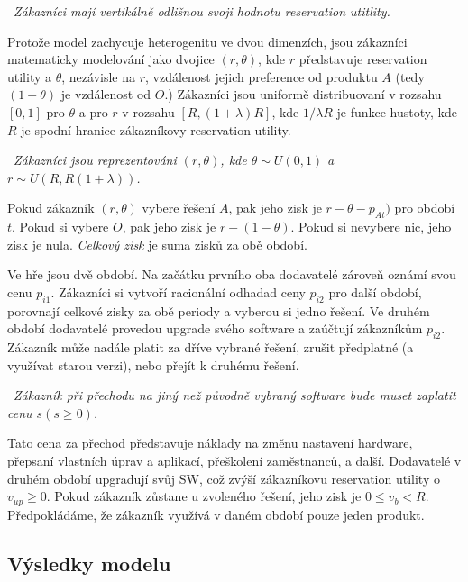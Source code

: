 \begin{multicols}{2}
	\vspace{10pt}
	~{\em Zákazníci mají vertikálně odlišnou svoji hodnotu reservation utitlity.}
	\vspace{10pt}

	Protože model zachycuje heterogenitu ve dvou dimenzích, jsou zákazníci matematicky modelování jako dvojice $(r,\theta)$, kde $r$ představuje reservation utility a $\theta$, nezávisle na $r$, vzdálenost jejich preference od produktu $A$ (tedy $(1-\theta)$ je vzdálenost od $O$.) Zákazníci jsou uniformě distribuovaní v rozsahu $[0,1]$ pro $\theta$ a pro $r$ v rozsahu $[R, (1+\lambda)R]$, kde $1/\lambda R$ je funkce hustoty, kde $R$ je spodní hranice zákazníkovy reservation utility.

		\vspace{10pt}
		~{\em Zákazníci jsou reprezentováni $(r,\theta)$, kde $\theta \sim U(0,1)$ a $r \sim U(R, R(1+\lambda))$.}
		\vspace{10pt}

	Pokud zákazník $(r,\theta)$ vybere řešení $A$, pak jeho zisk je $r-\theta - p_{At})$ pro období $t$. Pokud si vybere $O$, pak jeho zisk je $r-(1-\theta)$. Pokud si nevybere nic, jeho zisk je nula. {\em Celkový zisk} je suma zisků za obě období.

	Ve hře jsou dvě období. Na začátku prvního oba dodavatelé zároveň oznámí svou cenu $p_{i1}$. Zákazníci si vytvoří racionální odhadad ceny $p_{i2}$ pro další období, porovnají celkové zisky za obě periody a vyberou si jedno řešení. Ve druhém období dodavatelé provedou upgrade svého software a zaúčtují zákazníkům $p_{i2}$. Zákazník může nadále platit za dříve vybrané řešení, zrušit předplatné (a využívat starou verzi), nebo přejít k druhému řešení.

		\vspace{10pt}
		~{\em Zákazník při přechodu na jiný než původně vybraný software bude muset zaplatit cenu $s (s\geq0)$.}
		\vspace{10pt}

	Tato cena za přechod představuje náklady na změnu nastavení hardware, přepsaní vlastních úprav a aplikací, přeškolení zaměstnanců, a další. Dodavatelé v druhém období upgradují svůj SW, což zvýší zákazníkovu reservation utility o $v_{up}\geq0$. Pokud zákazník zůstane u zvoleného řešení, jeho zisk je $0\leq v_b < R$. Předpokládáme, že zákazník využívá v daném období pouze jeden produkt.

	\subsection*{Výsledky modelu}


\end{multicols}

